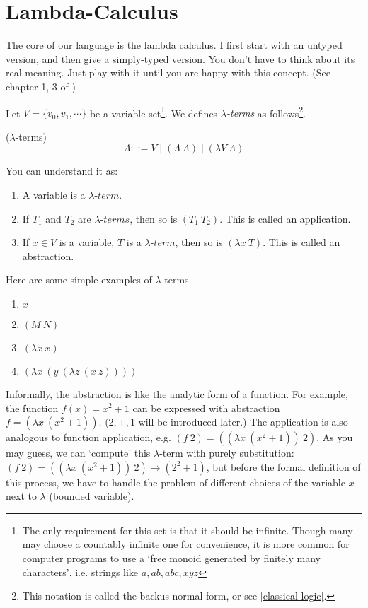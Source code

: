 \section{Lambda-Calculus}
The core of our language is the lambda calculus. I first start with an
untyped version, and then give a simply-typed version. You don't
have to think about its real meaning. Just play with it until you are
happy with this concept. (See chapter 1, 3 of \cite{Curry-Howard})

Let $V=\{v_0, v_1, \cdots\}$ be a variable set\footnote{The only
requirement for this set is that it should be infinite. Though many
may choose a countably infinite one for convenience, it is more common
for computer programs to use a `free monoid generated by finitely many
characters', i.e. strings like $a,ab,abc,xyz$}.  We defines
{\it$\lambda$-terms} as follows\footnote{This notation is
called the backus normal form, or see \autoref{classical-logic}.}. 

\begin{definition}\label{lambda-term}($\lambda$-terms)
    $$\Lambda ::= V \mid (\Lambda\ \Lambda) \mid (\lambda V\ \Lambda)$$
\end{definition}

You can understand it as:
\begin{enumerate}
    \item A variable is a $\lambda$-$term$.
    \item If $T_1$ and $T_2$ are $\lambda$-$terms$, then so is $(T_1\ T_2)$.
    This is called an application.
    \item If $x\in V$ is a variable, $T$ is a $\lambda$-$term$, then so
    is $(\lambda x\ T)$. This is called an abstraction. 
\end{enumerate}

Here are some simple examples of $\lambda$-terms.
\begin{enumerate}
    \item $x$
    \item $(M\ N)$
    \item $(\lambda x\  x)$
    \item $(\lambda x\ (y\ (\lambda z\ (x\ z))))$
\end{enumerate}

Informally, the abstraction is like the analytic form of a function.
For example, the function $f(x) = x^2 + 1$ can be expressed with 
abstraction $f=(\lambda x\ (x^2+1))$. ($2,+,1$ will be introduced later.)
The application is also analogous to function application, e.g. 
$(f\ 2)=((\lambda x\ (x^2+1))\ 2)$. As you may guess, we can `compute' 
this $\lambda$-term with purely substitution: 
$(f\ 2)=((\lambda x\ (x^2+1))\ 2)\to (2^2+1)$, but before the formal
definition of this process, we have to handle the problem of
different choices of the variable $x$ next to $\lambda$ (bounded variable). 

